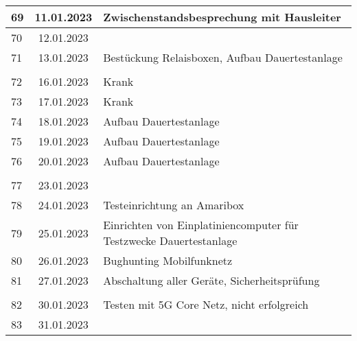 \begin{longtable}{|l|c|l|}
69  & 11.01.2023    &  Zwischenstandsbesprechung mit Hausleiter                                                      \\ \hline 
70  & 12.01.2023    &                                                       \\ \hline 
71  & 13.01.2023    &  Bestückung Relaisboxen, Aufbau Dauertestanlage                                                     \\ \hline 
&               &                                                       \\ \hline 
72  & 16.01.2023    & Krank                                                      \\ \hline 
73  & 17.01.2023    & Krank                                                      \\ \hline 
74  & 18.01.2023    & Aufbau Dauertestanlage                                                      \\ \hline 
75  & 19.01.2023    & Aufbau Dauertestanlage                                                        \\ \hline 
76  & 20.01.2023    & Aufbau Dauertestanlage                                                       \\ \hline
&               &                                                       \\ \hline  
77  & 23.01.2023    &                                                       \\ \hline 
78  & 24.01.2023    &  Testeinrichtung an Amaribox                                                     \\ \hline 
79  & 25.01.2023    &  Einrichten von Einplatiniencomputer für Testzwecke Dauertestanlage                                                      \\ \hline 
80  & 26.01.2023    &  Bughunting \q{spezielles} Mobilfunknetz                                                     \\ \hline 
81  & 27.01.2023    &  Abschaltung aller Geräte, Sicherheitsprüfung                                                     \\ \hline
&               &                                                       \\ \hline  
82  & 30.01.2023    &  Testen mit 5G Core Netz, nicht erfolgreich                                                     \\ \hline 
83  & 31.01.2023    &                                                         \\ \hline 

\end{longtable}

